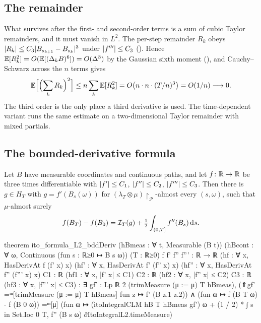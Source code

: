 \documentclass[11pt]{article}
\newcommand{\HT}{H_T}
\begin{document}
\subsection{The remainder}
What survives after the first- and second-order terms is a sum of cubic Taylor remainders, and it must vanish
in $L^2$. The per-step remainder $R_k$ obeys $\lvert R_k\rvert\le C_3\lvert B_{s_{k+1}}-B_{s_k}\rvert^3$ under
$\lvert f'''\rvert\le C_3$ (). Hence $\mathbb{E}[R_k^2]=O(\mathbb{E}[(\Delta_kB)^6])=O(\Delta^3)$ by the
Gaussian sixth moment (), and Cauchy--Schwarz across the $n$ terms gives
\[
  \mathbb{E}\Bigl[\Bigl(\sum_kR_k\Bigr)^2\Bigr]\le n\sum_k\mathbb{E}[R_k^2]=O\bigl(n\cdot n\cdot(T/n)^3\bigr)=O(1/n)\longrightarrow0 .
\]
The third order is the only place a third derivative is used. The time-dependent variant runs the same
estimate on a two-dimensional Taylor remainder with mixed partials.

\subsection{The bounded-derivative formula}

\begin{theorem}\label{thm:ito-bdd}
Let $B$ have measurable coordinates and continuous paths, and let $f\colon\mathbb{R}\to\mathbb{R}$ be three times
differentiable with $\lvert f'\rvert\le C_1$, $\lvert f''\rvert\le C_2$, $\lvert f'''\rvert\le C_3$. Then there is
$g\in\HT$ with $g=f'(B_s(\omega))$ for $(\lambda_T\otimes\mu)\restriction_{\mathcal P}$-almost every $(s,\omega)$,
such that $\mu$-almost surely
\[
  f(B_T)-f(B_0)=\mathcal{I}_T(g)+\tfrac12\int_{(0,T]}f''(B_s)\,\mathrm{d} s .
\]
\end{theorem}

\begin{leancode}[caption={It\^o's formula, bounded-derivative class (\texttt{Foundations/ItoFormulaCLM}).},label=lst:itobdd]
theorem ito_formula_L2_bddDeriv
    (hBmeas : ∀ t, Measurable (B t)) (hBcont : ∀ ω, Continuous (fun s : ℝ≥0 ↦ B s ω))
    (T : ℝ≥0) {f f' f'' f''' : ℝ → ℝ}
    (hf : ∀ x, HasDerivAt f (f' x) x) (hf' : ∀ x, HasDerivAt f' (f'' x) x)
    (hf'' : ∀ x, HasDerivAt f'' (f''' x) x)
    {C1 : ℝ} (hf1 : ∀ x, |f' x| ≤ C1) {C2 : ℝ} (hf2 : ∀ x, |f'' x| ≤ C2)
    {C3 : ℝ} (hf3 : ∀ x, |f''' x| ≤ C3) :
    ∃ gf' : Lp ℝ 2 (trimMeasure (μ := μ) T hBmeas),
      (⇑gf' =ᵐ[trimMeasure (μ := μ) T hBmeas] fun z ↦ f' (B z.1 z.2)) ∧
      (fun ω ↦ f (B T ω) - f (B 0 ω)) =ᵐ[μ]
        (fun ω ↦ (itoIntegralCLM hB T hBmeas gf') ω
          + (1 / 2) * ∫ s in Set.Ioc 0 T, f'' (B s ω) ∂ItoIntegralL2.timeMeasure)
\end{leancode}
\end{document}
